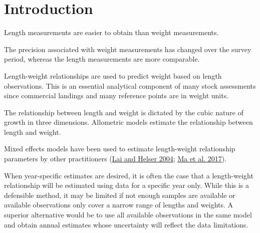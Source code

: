 \documentclass[12pt]{article}\usepackage[]{graphicx}\usepackage[]{color}
\begin{document}

\frontmatter


\renewcommand{\headrulewidth}{0.5pt}  %
\renewcommand{\footrulewidth}{0.5pt}  %

\newcommand{\lt}{\ensuremath <}
\newcommand{\gt}{\ensuremath >}

% 
\hypertarget{sec:introduction}{%
\section{Introduction}\label{sec:introduction}}

Length measurements are easier to obtain than weight measurements.

The precision associated with weight measurements has changed over the survey period, whereas the length measurements are more comparable.

Length-weight relationships are used to predict weight based on length observations. This is an essential analytical component of many stock assessments since commercial landings and many reference points are in weight units.

The relationship between length and weight is dictated by the cubic nature of growth in three dimensions. Allometric models estimate the relationship between length and weight.

Mixed effects models have been used to estimate length-weight relationship parameters by other practitioners (\protect\hyperlink{ref-Lai-Hesler-2004}{Lai and Helser 2004}; \protect\hyperlink{ref-Ma-etal-2017}{Ma et al. 2017}).

When year-specific estimates are desired, it is often the case that a length-weight relationship will be estimated using data for a specific year only. While this is a defensible method, it may be limited if not enough samples are available or available observations only cover a narrow range of lengths and weights. A superior alternative would be to use all available observations in the same model and obtain annual estimates whose uncertainty will reflect the data limitations.
\end{document}
